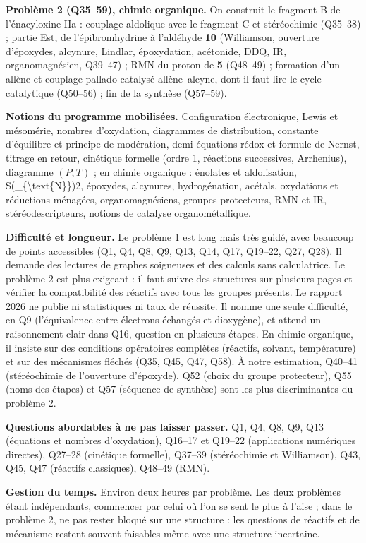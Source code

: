 \documentclass[11pt,a4paper]{article}
\begin{document}
\textbf{Problème 2 (Q35--59), chimie organique.} On construit le fragment B de l'énacyloxine IIa : couplage aldolique avec le fragment C et stéréochimie (Q35--38) ; partie Est, de l'épibromhydrine à l'aldéhyde \textbf{10} (Williamson, ouverture d'époxydes, alcynure, Lindlar, époxydation, acétonide, DDQ, IR, organomagnésien, Q39--47) ; RMN du proton de \textbf{5} (Q48--49) ; formation d'un allène et couplage pallado-catalysé allène--alcyne, dont il faut lire le cycle catalytique (Q50--56) ; fin de la synthèse (Q57--59).

\textbf{Notions du programme mobilisées.} Configuration électronique, Lewis et mésomérie, nombres d'oxydation, diagrammes de distribution, constante d'équilibre et principe de modération, demi-équations rédox et formule de Nernst, titrage en retour, cinétique formelle (ordre 1, réactions successives, Arrhenius), diagramme \((P,T)\) ; en chimie organique : énolates et aldolisation, S(\_\{\textbackslash text\{N\}\})2, époxydes, alcynures, hydrogénation, acétals, oxydations et réductions ménagées, organomagnésiens, groupes protecteurs, RMN et IR, stéréodescripteurs, notions de catalyse organométallique.

\textbf{Difficulté et longueur.} Le problème 1 est long mais très guidé, avec beaucoup de points accessibles (Q1, Q4, Q8, Q9, Q13, Q14, Q17, Q19--22, Q27, Q28). Il demande des lectures de graphes soigneuses et des calculs sans calculatrice. Le problème 2 est plus exigeant : il faut suivre des structures sur plusieurs pages et vérifier la compatibilité des réactifs avec tous les groupes présents. Le rapport 2026 ne publie ni statistiques ni taux de réussite. Il nomme une seule difficulté, en Q9 (l'équivalence entre électrons échangés et dioxygène), et attend un raisonnement clair dans Q16, question en plusieurs étapes. En chimie organique, il insiste sur des conditions opératoires complètes (réactifs, solvant, température) et sur des mécanismes fléchés (Q35, Q45, Q47, Q58). À notre estimation, Q40--41 (stéréochimie de l'ouverture d'époxyde), Q52 (choix du groupe protecteur), Q55 (noms des étapes) et Q57 (séquence de synthèse) sont les plus discriminantes du problème 2.

\textbf{Questions abordables à ne pas laisser passer.} Q1, Q4, Q8, Q9, Q13 (équations et nombres d'oxydation), Q16--17 et Q19--22 (applications numériques directes), Q27--28 (cinétique formelle), Q37--39 (stéréochimie et Williamson), Q43, Q45, Q47 (réactifs classiques), Q48--49 (RMN).

\textbf{Gestion du temps.} Environ deux heures par problème. Les deux problèmes étant indépendants, commencer par celui où l'on se sent le plus à l'aise ; dans le problème 2, ne pas rester bloqué sur une structure : les questions de réactifs et de mécanisme restent souvent faisables même avec une structure incertaine.
\end{document}
